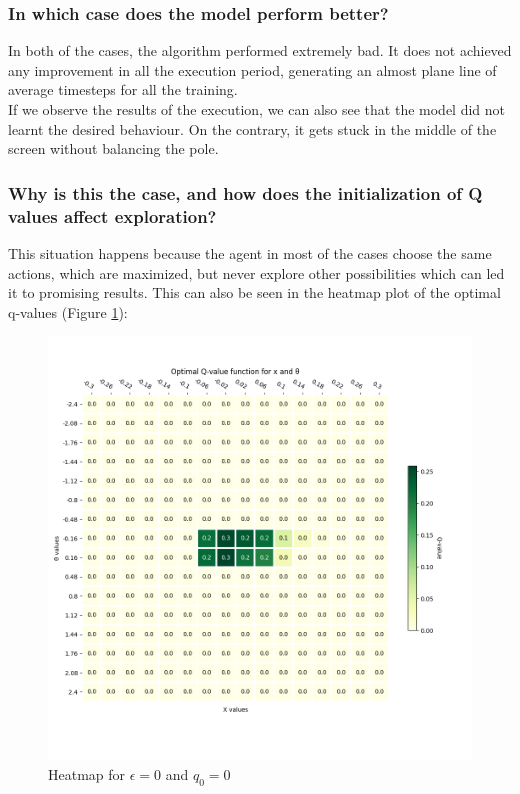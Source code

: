 \documentclass[12pt]{article}
\begin{document}
\subsubsection{In which case does the model perform better?}

In both of the cases, the algorithm performed extremely bad. It does not achieved any improvement in all the execution period, generating an almost plane line of average timesteps for all the training. \\

If we observe the results of the execution, we can also see that the model did not learnt the desired behaviour. On the contrary, it gets stuck in the middle of the screen without balancing the pole.

\subsubsection{Why is this the case, and how does the initialization of Q values
affect exploration?}

This situation happens because the agent in most of the cases choose the same actions, which are maximized, but never explore other possibilities which can led it to promising results. This can also be seen in the heatmap plot of the optimal q-values (Figure \ref{fig:q2-2}):

\begin{figure}[h]
    \centering
    \includegraphics[scale=0.25]{exercise-3/plots/heatmap-fixed-0.0.png}
    \caption{Heatmap for $\epsilon=0$ and $q_0 = 0$}
    \label{fig:q2-2}
\end{figure}
\end{document}
